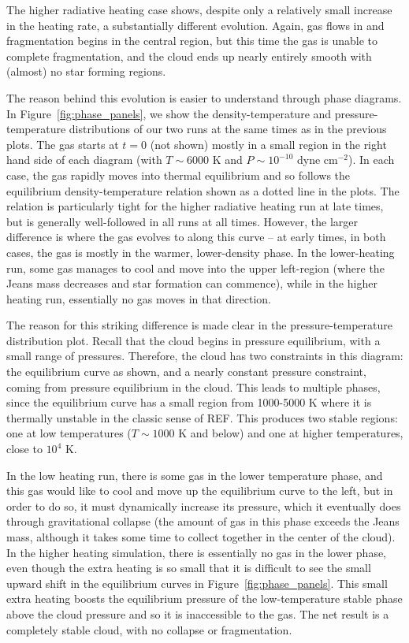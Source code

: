 \documentclass[useAMS,usenatbib]{mn2e}
\begin{document}
The higher radiative heating case shows, despite only a relatively small increase in the heating rate, a substantially different evolution.  Again, gas flows in and fragmentation begins in the central region, but this time the gas is unable to complete fragmentation, and the cloud ends up nearly entirely smooth with (almost) no star forming regions.

The reason behind this evolution is easier to understand through phase diagrams.  In Figure~\ref{fig:phase_panels}, we show the density-temperature and pressure-temperature distributions of our two runs at the same times as in the previous plots.  The gas starts at $t=0$ (not shown) mostly in a small region in the right hand side of each diagram (with $T \sim 6000$ K and $P \sim 10^{-10}$ dyne cm$^{-2}$).  In each case, the gas rapidly moves into thermal equilibrium and so follows the equilibrium density-temperature relation shown as a dotted line in the plots.  The relation is particularly tight for the higher radiative heating run at late times, but is generally well-followed in all runs at all times.  However, the larger difference is where the gas evolves to along this curve -- at early times, in both cases, the gas is mostly in the warmer, lower-density phase.  In the lower-heating run, some gas manages to cool and move into the upper left-region (where the Jeans mass decreases and star formation can commence), while in the higher heating run, essentially no gas moves in that direction.  

The reason for this striking difference is made clear in the pressure-temperature distribution plot.  Recall that the cloud begins in pressure equilibrium, with a small range of pressures.  Therefore, the cloud has two constraints in this diagram: the equilibrium curve as shown, and a nearly constant pressure constraint, coming from pressure equilibrium in the cloud.  This leads to multiple phases, since the equilibrium curve has a small region from 1000-5000 K where it is thermally unstable in the classic sense of REF.  This produces two stable regions: one at low temperatures ($T \sim 1000$ K and below) and one at higher temperatures, close to $10^4$ K.   

In the low heating run, there is some gas in the lower temperature phase, and this gas would like to cool and move up the equilibrium curve to the left, but in order to do so, it must dynamically increase its pressure, which it eventually does through gravitational collapse (the amount of gas in this phase exceeds the Jeans mass, although it takes some time to collect together in the center of the cloud).  In the higher heating simulation, there is essentially no gas in the lower phase, even though the extra heating is so small that it is difficult to see the small upward shift in the equilibrium curves in Figure~\ref{fig:phase_panels}.  This small extra heating boosts the equilibrium pressure of the low-temperature stable phase above the cloud pressure and so it is inaccessible to the gas.  The net result is a completely stable cloud, with no collapse or fragmentation.
\end{document}
